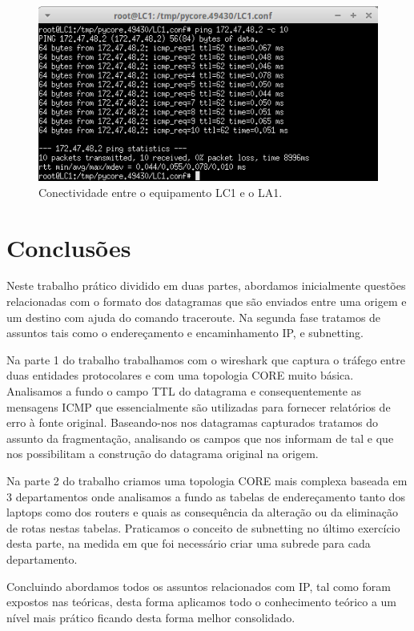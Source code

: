 \documentclass{llncs}
\begin{document}
\begin{figure}[H]
\begin{center}
\includegraphics[scale=0.60]{3_LC1_LA1.png} 
\end{center}
\caption{\label{fig:3_LC1_LA1} Conectividade entre o equipamento LC1 e o LA1.}
\end{figure}

\newpage

\section{Conclusões}
Neste trabalho prático dividido em duas partes, abordamos inicialmente questões relacionadas com o formato dos datagramas que são enviados entre uma origem e um destino com ajuda do comando traceroute. Na segunda fase tratamos de assuntos tais como o endereçamento e encaminhamento IP, e subnetting.

Na parte 1 do trabalho trabalhamos com o wireshark que captura o tráfego entre duas entidades protocolares e com uma topologia CORE muito básica. Analisamos a fundo o campo TTL do datagrama e consequentemente as mensagens ICMP que essencialmente são utilizadas para fornecer relatórios de erro à fonte original. Baseando-nos nos datagramas capturados tratamos do assunto da fragmentação, analisando os campos que nos informam de tal e que nos possibilitam a construção do datagrama original na origem.

Na parte 2 do trabalho criamos uma topologia CORE mais complexa baseada em 3 departamentos onde analisamos a fundo as tabelas de endereçamento tanto dos laptops como dos routers e quais as consequência da alteração ou da eliminação de rotas nestas tabelas. Praticamos o conceito de subnetting no último exercício desta parte, na medida em que foi necessário criar uma subrede para cada departamento.

Concluindo abordamos todos os assuntos relacionados com IP, tal como foram expostos nas teóricas, desta forma aplicamos todo o conhecimento teórico a um nível mais prático ficando desta forma melhor consolidado.
\end{document}
